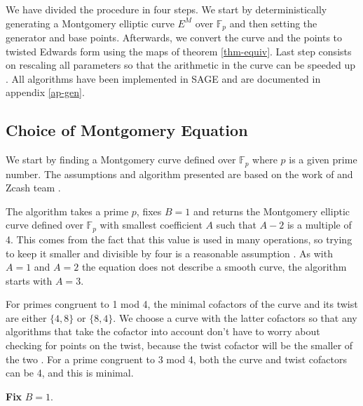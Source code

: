 \documentclass{article}
\newcommand{\Fp}{\ensuremath{\mathbb{F}_p}}
\theoremstyle{definition}
\theoremstyle{remark}
\begin{document}
\begin{spacing}{1.2}
\begin{multicols}{2}
We have divided the procedure in four steps. We start by deterministically generating a Montgomery elliptic curve $E^M$ over $\Fp$ and then setting the generator and base points. Afterwards, we convert the curve and the points to twisted Edwards form using the maps of theorem \ref{thm-equiv}. Last step consists on rescaling all parameters so that the arithmetic in the curve can be speeded up \cite{scaling}. %
All algorithms have been implemented in SAGE and are documented in appendix \ref{ap-gen}. 
	
\subsection{Choice of Montgomery Equation}

We start by finding a Montgomery curve defined over $\Fp$ where $p$ is a given prime number. The assumptions and algorithm presented are based on the work of \cite{generation-baby} and Zcash team \cite{github:zkcrypto:derive}.

The algorithm takes a prime $p$, fixes $B = 1$ and  returns the Montgomery elliptic curve defined over $\Fp$ with smallest coefficient $A$ such that $A-2$ is a multiple of 4. 
This comes from the fact that this value is used in many operations, so trying to keep it smaller and divisible by four is a reasonable assumption \cite{generation-baby}. As with $A=1$ and $A=2$ the equation does not describe a smooth curve, the algorithm starts with $A=3$.

For primes congruent to 1 mod 4, the minimal cofactors of the curve and its twist are either $\{4, 8\}$ or $\{8, 4\}$.  We choose a curve with the latter cofactors so that any algorithms that take the cofactor into account don't have to worry about checking for points on the twist, because the twist cofactor will be the smaller of the two \cite{generation-baby}. For a prime congruent to 3 mod 4, both the curve and twist cofactors can be 4, and this is minimal.  

\vspace{0.2cm}
\begin{algorithm}[H] %
	\SetAlgoLined
	
	
	{\bf Fix} $B = 1$.
	

\end{algorithm}
\end{multicols}
\end{spacing}
\end{document}
